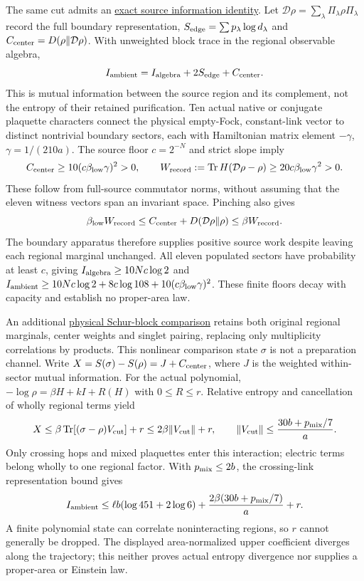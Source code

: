 The same cut admits an
\href{https://github.com/FloatingPragma/observer-patch-holography/blob/main/model/particle_primary_boundary_information/PROOF.md}{exact source information identity}.
Let $\mathcal D\rho=\sum_\lambda\Pi_\lambda\rho\Pi_\lambda$ record
the full boundary representation, $S_{\rm edge}=\sum p_\lambda\log d_\lambda$
and $C_{\rm center}=D(\rho\Vert\mathcal D\rho)$.
With unweighted block trace in the regional observable algebra,
\[
 I_{\rm ambient}=I_{\rm algebra}+2S_{\rm edge}+C_{\rm center}.
\]
This is mutual information between the source region and its complement,
not the entropy of their retained purification. Ten actual native or
conjugate plaquette characters connect the physical empty-Fock,
constant-link vector to distinct nontrivial boundary sectors, each with
Hamiltonian matrix element $-\gamma$, $\gamma=1/(210a)$.
The source floor $c=2^{-N}$ and strict slope imply
\[
 C_{\rm center}\ge10(c\beta_{\rm low}\gamma)^2>0,\qquad
 W_{\rm record}:=\operatorname{Tr}H(\mathcal D\rho-\rho)
       \ge20c\beta_{\rm low}\gamma^2>0.
\]
These follow from full-source commutator norms, without assuming that
the eleven witness vectors span an invariant space. Pinching also gives
\[
 \beta_{\rm low}W_{\rm record}
 \le C_{\rm center}+D(\mathcal D\rho\Vert\rho)
 \le\beta W_{\rm record}.
\]
The boundary apparatus therefore supplies positive source work despite
leaving each regional marginal unchanged. All eleven populated sectors
have probability at least $c$, giving
$I_{\rm algebra}\ge10Nc\log2$ and
$I_{\rm ambient}\ge10Nc\log2+8c\log108+10(c\beta_{\rm low}\gamma)^2$.
These finite floors decay with capacity and establish no proper-area law.

An additional \href{https://github.com/FloatingPragma/observer-patch-holography/blob/main/model/particle_primary_boundary_correlation/PROOF.md}{physical Schur-block comparison}
retains both original regional marginals, center weights and singlet
pairing, replacing only multiplicity correlations by products. This
nonlinear comparison state $\sigma$ is not a preparation channel.
Write $X=S(\sigma)-S(\rho)=J+C_{\rm center}$, where $J$ is the
weighted within-sector mutual information. For the actual polynomial,
$-\log\rho=\beta H+kI+R(H)$ with $0\le R\le r$. Relative entropy and
cancellation of wholly regional terms yield
\[
 X\le\beta\operatorname{Tr}[(\sigma-\rho)V_{\rm cut}]+r
   \le2\beta\|V_{\rm cut}\|+r,\qquad
 \|V_{\rm cut}\|\le\frac{30b+p_{\rm mix}/7}{a}.
\]
Only crossing hops and mixed plaquettes enter this interaction;
electric terms belong wholly to one regional factor. With
$p_{\rm mix}\le2b$, the crossing-link representation bound gives
\[
 I_{\rm ambient}\le\ell b(\log451+2\log6)
       +\frac{2\beta(30b+p_{\rm mix}/7)}a+r.
\]
A finite polynomial state can correlate noninteracting regions, so
$r$ cannot generally be dropped. The displayed area-normalized upper
coefficient diverges along the trajectory; this neither proves actual
entropy divergence nor supplies a proper-area or Einstein law.

